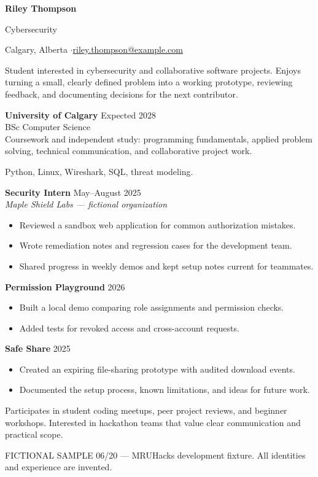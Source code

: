 
{\Huge\bfseries Riley Thompson}\par
{\large\color{accent} Cybersecurity}\par
Calgary, Alberta \enspace$\cdot$\enspace \href{mailto:riley.thompson@example.com}{riley.thompson@example.com}

Student interested in cybersecurity and collaborative software projects.
Enjoys turning a small, clearly defined problem into a working prototype,
reviewing feedback, and documenting decisions for the next contributor.

\textbf{University of Calgary} \hfill Expected 2028\\
BSc Computer Science\\
Coursework and independent study: programming fundamentals, applied problem solving,
technical communication, and collaborative project work.

Python, Linux, Wireshark, SQL, threat modeling.

\textbf{Security Intern} \hfill May--August 2025\\
\textit{Maple Shield Labs --- fictional organization}
\begin{itemize}
\item Reviewed a sandbox web application for common authorization mistakes.
\item Wrote remediation notes and regression cases for the development team.
\item Shared progress in weekly demos and kept setup notes current for teammates.
\end{itemize}

\textbf{Permission Playground} \hfill 2026
\begin{itemize}
\item Built a local demo comparing role assignments and permission checks.
\item Added tests for revoked access and cross-account requests.
\end{itemize}
\textbf{Safe Share} \hfill 2025
\begin{itemize}
\item Created an expiring file-sharing prototype with audited download events.
\item Documented the setup process, known limitations, and ideas for future work.
\end{itemize}

Participates in student coding meetups, peer project reviews, and beginner workshops.
Interested in hackathon teams that value clear communication and practical scope.

\vfill
{\footnotesize\color{gray} FICTIONAL SAMPLE 06/20 --- MRUHacks development fixture.
All identities and experience are invented.}

